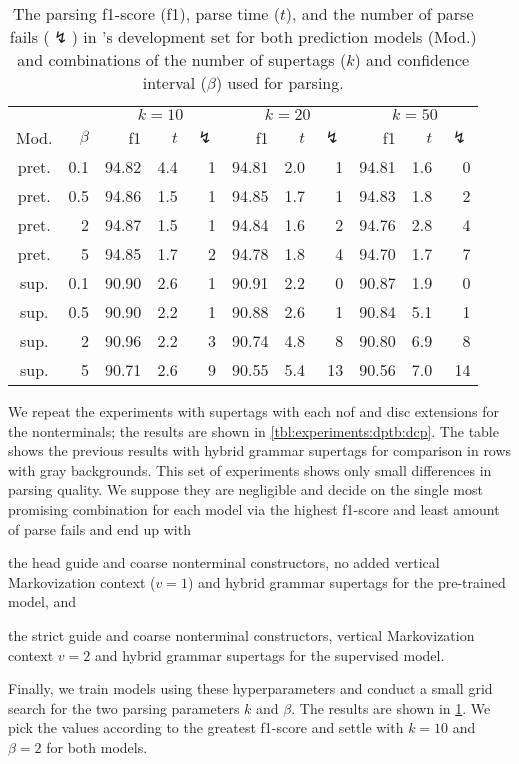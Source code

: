 \documentclass[../../document.tex]{subfiles}
\begin{document}
    \begin{table}
        \caption{\label{tbl:experiments:dptb:k}
        The parsing f1-score (f1), parse time ($t$), and the number of parse fails ($\lightning$) in \dptb{}'s development set for both prediction models (Mod.) and combinations of the number of supertags ($k$) and confidence interval ($\beta$) used for parsing.
        }
        \centering
        \setlength{\tabcolsep}{4pt}
        \vspace{.2cm}
        \begin{tabular}{cr|rrr|rrr|rrr}
            \toprule
&     &       \multicolumn{3}{c|}{$k = 10$} & \multicolumn{3}{c|}{$k = 20$} & \multicolumn{3}{c}{$k = 50$} \\
Mod. &  $\beta$  & f1 & $t$ & $\lightning$ & f1 & $t$ & $\lightning$ & f1 & $t$ & $\lightning$ \\ \hline
pret. & 0.1  & 94.82 & 4.4 & 1 & 94.81 & 2.0 & 1 & 94.81 & 1.6 & 0 \\
pret. & 0.5  & 94.86 & 1.5 & 1 & 94.85 & 1.7 & 1 & 94.83 & 1.8 & 2 \\
pret. &   2  & 94.87 & 1.5 & 1 & 94.84 & 1.6 & 2 & 94.76 & 2.8 & 4 \\
pret. &   5  & 94.85 & 1.7 & 2 & 94.78 & 1.8 & 4 & 94.70 & 1.7 & 7 \\
\midrule
sup. & 0.1  & 90.90 & 2.6 & 1 & 90.91 & 2.2 &  0 & 90.87 & 1.9 &  0 \\
sup. & 0.5  & 90.90 & 2.2 & 1 & 90.88 & 2.6 &  1 & 90.84 & 5.1 &  1 \\
sup. &   2  & 90.96 & 2.2 & 3 & 90.74 & 4.8 &  8 & 90.80 & 6.9 &  8 \\
sup. &   5  & 90.71 & 2.6 & 9 & 90.55 & 5.4 & 13 & 90.56 & 7.0 & 14 \\
    \bottomrule
        \end{tabular}
    \end{table}

    We repeat the experiments with  supertags with each nof and disc extensions for the nonterminals; the results are shown in \cref{tbl:experiments:dptb:dcp}.
    The table shows the previous results with hybrid grammar supertags for comparison in rows with gray backgrounds.
    This set of experiments shows only small differences in parsing quality.
    We suppose they are negligible and decide on the single most promising combination for each model via the highest f1-score and least amount of parse fails and end up with
    \begin{compactitem}
        \item the head guide and coarse nonterminal constructors, no added vertical Markovization context ($v=1$) and hybrid grammar supertags for the pre-trained model, and
        \item the strict guide and coarse nonterminal constructors, vertical Markovization context \(v=2\) and hybrid grammar supertags for the supervised model.
    \end{compactitem}
    Finally, we train models using these hyperparameters and conduct a small grid search for the two parsing parameters \(k\) and \(\beta\). The results are shown in \cref{tbl:experiments:dptb:k}.
    We pick the values according to the greatest f1-score and settle with \(k=10\) and \(\beta=2\) for both models.
\end{document}
